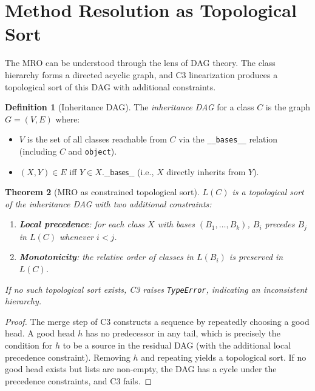 \documentclass[11pt,a4paper]{report}
\theoremstyle{definition}
\newtheorem{definition}{Definition}[chapter]
\theoremstyle{plain}
\newtheorem{theorem}[definition]{Theorem}
\begin{document}
\section{Method Resolution as Topological Sort}

The MRO can be understood through the lens of DAG theory.  The class
hierarchy forms a directed acyclic graph, and C3 linearization produces
a topological sort of this DAG with additional constraints.

\begin{definition}[Inheritance DAG]
\label{def:inheritance-dag}
The \emph{inheritance DAG} for a class $C$ is the graph $G = (V, E)$ where:
\begin{itemize}
  \item $V$ is the set of all classes reachable from $C$ via the
    \lstinline[style=python]{__bases__} relation (including $C$ and
    \lstinline[style=python]{object}).
  \item $(X, Y) \in E$ iff $Y \in X.\mathsf{\_\_bases\_\_}$ (i.e., $X$
    directly inherits from $Y$).
\end{itemize}
\end{definition}

\begin{theorem}[MRO as constrained topological sort]
\label{thm:mro-topo}
$L(C)$ is a topological sort of the inheritance DAG with two additional
constraints:
\begin{enumerate}
  \item \textbf{Local precedence}: for each class $X$ with bases
    $(B_1, \ldots, B_k)$, $B_i$ precedes $B_j$ in $L(C)$ whenever $i < j$.
  \item \textbf{Monotonicity}: the relative order of classes in $L(B_i)$
    is preserved in $L(C)$.
\end{enumerate}
If no such topological sort exists, C3 raises
\lstinline[style=python]{TypeError}, indicating an inconsistent hierarchy.
\end{theorem}
\begin{proof}
The merge step of C3 constructs a sequence by repeatedly choosing a good head.
A good head $h$ has no predecessor in any tail, which is precisely the condition
for $h$ to be a source in the residual DAG (with the additional local precedence
constraint).  Removing $h$ and repeating yields a topological sort.
If no good head exists but lists are non-empty, the DAG has a cycle under the
precedence constraints, and C3 fails.
\end{proof}
\end{document}
